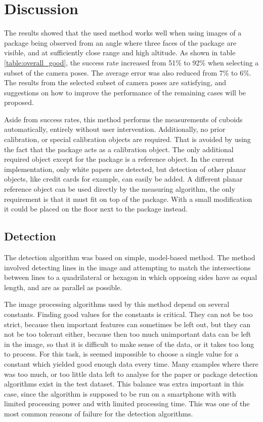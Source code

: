 \chapter{Discussion}
The results showed that the used method works well when using images of a package being observed from an angle where three faces of the package are visible, and at sufficiently close range and high altitude. 
As shown in table \ref{table:overall_good}, the success rate increased from 51\% to 92\% when selecting a subset of the camera poses.
The average error was also reduced from 7\% to 6\%.
The results from the selected subset of camera poses are satisfying, and suggestions on how to improve the performance of the remaining cases will be proposed.

Aside from success rates, this method performs the measurements of cuboids automatically, entirely without user intervention.
Additionally, no prior calibration, or special calibration objects are required.
That is avoided by using the fact that the package acts as a calibration object.
The only additional required object except for the package is a reference object.
In the current implementation, only white papers are detected, but detection of other planar objects, like credit cards for example, can easily be added.
A different planar reference object can be used directly by the measuring algorithm, the only requirement is that it must fit on top of the package.
With a small modification it could be placed on the floor next to the package instead.

\section{Detection} \label{discussion:detection}
The detection algorithm was based on simple, model-based method. 
The method involved detecting lines in the image and attempting to match the intersections between lines to a quadrilateral or hexagon in which opposing sides have as equal length, and are as parallel as possible.

The image processing algorithms used by this method depend on several constants.
Finding good values for the constants is critical.
They can not be too strict, because then important features can sometimes be left out, but they can not be too tolerant either, because then too much unimportant data can be left in the image, so that it is difficult to make sense of the data, or it takes too long to process.
For this task, is seemed impossible to choose a single value for a constant which yielded good enough data every time.
Many examples where there was too much, or too little data left to analyse for the paper or package detection algorithms exist in the test dataset.
This balance was extra important in this case, since the algorithm is supposed to be run on a smartphone with with limited processing power and with limited processing time.
This was one of the most common reasons of failure for the detection algorithms.

